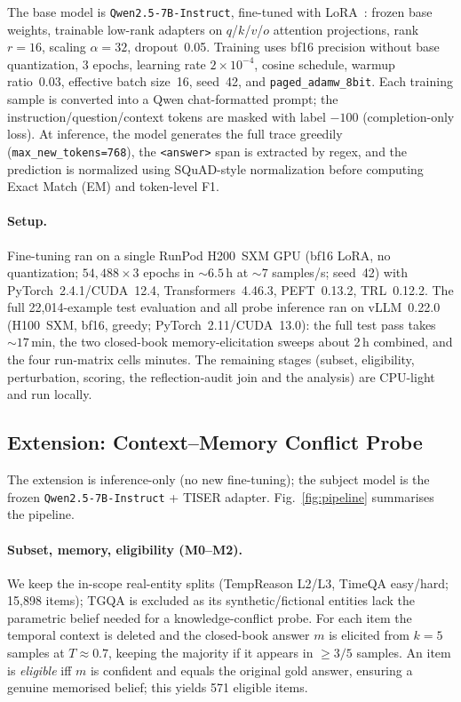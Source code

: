 \documentclass[conference]{IEEEtran}
\begin{document}
The base model is \texttt{Qwen2.5-7B-Instruct}, fine-tuned with LoRA~\cite{hu2022lora}: frozen base weights, trainable low-rank adapters on $q$/$k$/$v$/$o$ attention projections, rank $r{=}16$, scaling $\alpha{=}32$, dropout~0.05. Training uses bf16 precision without base quantization, 3 epochs, learning rate $2{\times}10^{-4}$, cosine schedule, warmup ratio~0.03, effective batch size~16, seed~42, and \texttt{paged\_adamw\_8bit}. Each training sample is converted into a Qwen chat-formatted prompt; the instruction/question/context tokens are masked with label $-100$ (completion-only loss). At inference, the model generates the full trace greedily (\texttt{max\_new\_tokens=768}), the \texttt{<answer>} span is extracted by regex, and the prediction is normalized using SQuAD-style normalization before computing Exact Match (EM) and token-level F1.

\paragraph{Setup.}
Fine-tuning ran on a single RunPod H200~SXM GPU (bf16 LoRA, no quantization; $54{,}488{\times}3$ epochs in ${\sim}6.5$\,h at ${\sim}7$ samples/s; seed~42) with PyTorch~2.4.1/CUDA~12.4, Transformers~4.46.3, PEFT~0.13.2, TRL~0.12.2. The full 22{,}014-example test evaluation and all probe inference ran on vLLM~0.22.0 (H100~SXM, bf16, greedy; PyTorch~2.11/CUDA~13.0): the full test pass takes ${\sim}17$\,min, the two closed-book memory-elicitation sweeps about 2\,h combined, and the four run-matrix cells minutes. The remaining stages (subset, eligibility, perturbation, scoring, the reflection-audit join and the analysis) are CPU-light and run locally.

\subsection{Extension: Context--Memory Conflict Probe}

The extension is inference-only (no new fine-tuning); the subject model is the frozen \texttt{Qwen2.5-7B-Instruct} + TISER adapter. Fig.~\ref{fig:pipeline} summarises the pipeline.

\paragraph{Subset, memory, eligibility (M0--M2).}
We keep the in-scope real-entity splits (TempReason L2/L3, TimeQA easy/hard; 15,898 items); TGQA is excluded as its synthetic/fictional entities lack the parametric belief needed for a knowledge-conflict probe. For each item the temporal context is deleted and the closed-book answer $m$ is elicited from $k{=}5$ samples at $T{\approx}0.7$, keeping the majority if it appears in ${\geq}3/5$ samples. An item is \emph{eligible} iff $m$ is confident and equals the original gold answer, ensuring a genuine memorised belief; this yields 571 eligible items.
\end{document}
